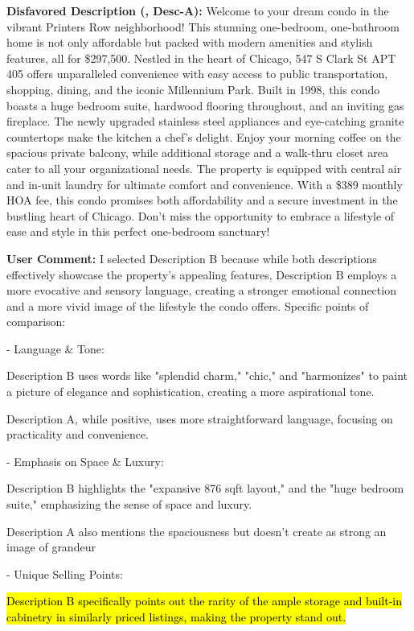 \begin{center}
\begin{tcolorbox}[colback=white,colframe=gray!20,width=0.95\textwidth]
{\footnotesize \textbf{Disfavored Description (\agentname [w/o Grounding], Desc-A):} Welcome to your dream condo in the vibrant Printers Row neighborhood! This stunning one-bedroom, one-bathroom home is not only affordable but packed with modern amenities and stylish features, all for \$297,500. Nestled in the heart of Chicago, 547 S Clark St APT 405 offers unparalleled convenience with easy access to public transportation, shopping, dining, and the iconic Millennium Park. Built in 1998, this condo boasts a huge bedroom suite, hardwood flooring throughout, and an inviting gas fireplace. The newly upgraded stainless steel appliances and eye-catching granite countertops make the kitchen a chef's delight. Enjoy your morning coffee on the spacious private balcony, while additional storage and a walk-thru closet area cater to all your organizational needs. The property is equipped with central air and in-unit laundry for ultimate comfort and convenience. With a \$389 monthly HOA fee, this condo promises both affordability and a secure investment in the bustling heart of Chicago. Don't miss the opportunity to embrace a lifestyle of ease and style in this perfect one-bedroom sanctuary!}

\vspace{0.2em}

{\footnotesize \textbf{User Comment:}
I selected Description B because while both descriptions effectively showcase the property's appealing features, Description B employs a more evocative and sensory language, creating a stronger emotional connection and a more vivid image of the lifestyle the condo offers. Specific points of comparison: 

- Language \& Tone:

Description B uses words like "splendid charm," "chic," and "harmonizes" to paint a picture of elegance and sophistication, creating a more aspirational tone.

Description A, while positive, uses more straightforward language, focusing on practicality and convenience.

- Emphasis on Space \& Luxury:

Description B highlights the "expansive 876 sqft layout," and the "huge bedroom suite," emphasizing the sense of space and luxury.

Description A also mentions the spaciousness but doesn’t create as strong an image of grandeur

- Unique Selling Points:

\hl{Description B specifically points out the rarity of the ample storage and built-in cabinetry in similarly priced listings, making the property stand out.}

}
\end{tcolorbox}
\end{center}
